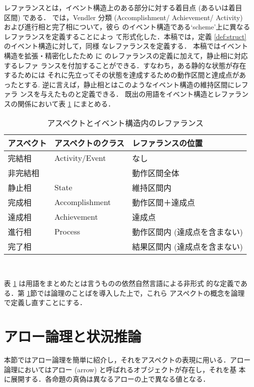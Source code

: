 レファランスとは，イベント構造上のある部分に対する着目点 (あるいは着目
区間) である．\cite{Kamp93} では，Vendler 分類 
(Accomplishment/ Achievement/ Activity) および進行相と完了相について，彼ら
のイベント構造である`scheme'上に異なるレファランスを定義することによっ
て形式化した．本稿では，定義 \ref{def:struct}のイベント構造に対して，同様
なレファランスを定義する． 本稿ではイベント構造を拡張・精密化したため
に \cite{Kamp93} のレファランスの定義に加えて，静止相に対応するレファ
ランスを付加することができる．すなわち，ある静的な状態が存在するためには
それに先立ってその状態を達成するための動作区間と達成点があったとする.
逆に言えば，静止相とはこのようなイベント構造の維持区間にレファラ
ンスを与えたものと定義できる．
既出の用語をイベント構造とレファランスの関係において表 \ref{tab:ref} 
にまとめる．

\begin{table}
\begin{center}
\begin{tabular}[b]{l|l|l}\hline
アスペクト&アスペクトのクラス&レファランスの位置\\ \hline\hline
完結相 & Activity/Event& なし\\
非完結相 & & 動作区間全体\\
静止相 & State & 維持区間内\\ 
完成相 &Accomplishment& 動作区間＋達成点 \\
達成相 &Achievement& 達成点\\ 
進行相&Process & 動作区間内 (達成点を含まない) \\
完了相 & & 結果区間内 (達成点を含まない) \\ \hline
\end{tabular}
\end{center}
\caption{アスペクトとイベント構造内のレファランス}\label{tab:ref}~
\end{table}

表 \ref{tab:ref} は用語をまとめたとは言うものの依然自然言語による非形式
的な定義である．第 \ref{sec:arw}節では論理のことばを導入した上で，これら
アスペクトの概念を論理で定義し直すことにする．

\section{アロー論理と状況推論}\label{sec:arw}

本節ではアロー論理を簡単に紹介し，それをアスペクトの表現に用いる．アロー
論理においてはアロー (arrow) と呼ばれるオブジェクトが存在し，それを基
本に展開する．各命題の真偽は異なるアローの上で異なる値となる．

